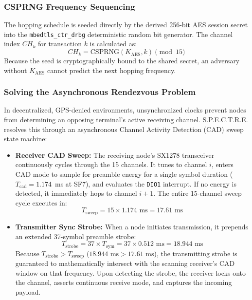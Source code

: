 \documentclass[conference]{IEEEtran}
\begin{document}
\subsubsection{CSPRNG Frequency Sequencing}
The hopping schedule is seeded directly by the derived 256-bit AES session secret into the \texttt{mbedtls\_ctr\_drbg} deterministic random bit generator. The channel index $CH_k$ for transaction $k$ is calculated as:
\begin{equation}
CH_k = \text{CSPRNG}(K_{\text{AES}}, k) \pmod{15}
\end{equation}
Because the seed is cryptographically bound to the shared secret, an adversary without $K_{\text{AES}}$ cannot predict the next hopping frequency.

\subsubsection{Solving the Asynchronous Rendezvous Problem}
In decentralized, GPS-denied environments, unsynchronized clocks prevent nodes from determining an opposing terminal's active receiving channel. S.P.E.C.T.R.E. resolves this through an asynchronous Channel Activity Detection (CAD) sweep state machine:
\begin{itemize}
    \item \textbf{Receiver CAD Sweep:} The receiving node's SX1278 transceiver continuously cycles through the 15 channels. It tunes to channel $i$, enters CAD mode to sample for preamble energy for a single symbol duration ($T_{\text{cad}} = 1.174$~ms at SF7), and evaluates the \texttt{DIO1} interrupt. If no energy is detected, it immediately hops to channel $i+1$. The entire 15-channel sweep cycle executes in:
    \begin{equation}
    T_{\text{sweep}} = 15 \times 1.174\text{ ms} = 17.61\text{ ms}
    \end{equation}
    \item \textbf{Transmitter Sync Strobe:} When a node initiates transmission, it prepends an extended 37-symbol preamble strobe:
    \begin{equation}
    T_{\text{strobe}} = 37 \times T_{\text{sym}} = 37 \times 0.512\text{ ms} = 18.944\text{ ms}
    \end{equation}
    Because $T_{\text{strobe}} > T_{\text{sweep}}$ ($18.944\text{ ms} > 17.61\text{ ms}$), the transmitting strobe is guaranteed to mathematically intersect with the scanning receiver's CAD window on that frequency. Upon detecting the strobe, the receiver locks onto the channel, asserts continuous receive mode, and captures the incoming payload.
\end{itemize}
\end{document}
